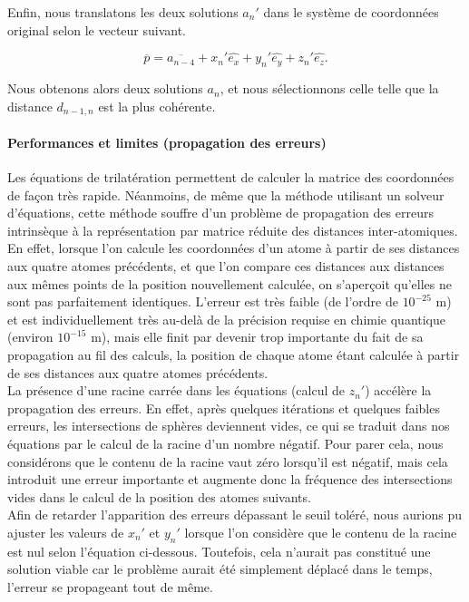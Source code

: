 \par Enfin, nous translatons les deux solutions $a_n'$ dans le système de coordonnées original selon le vecteur suivant.

\[
\overline{p} = \overline{a_{n-4}} + x_{n}'\hat{e_x} + y_{n}'\hat{e_y} + z_{n}'\hat{e_z}.
\]

\vspace{0.4cm}

Nous obtenons alors deux solutions $a_n$, et nous sélectionnons celle telle que la distance $d_{n-1,n}$ est la plus cohérente.


\paragraph{Performances et limites (propagation des erreurs)}
\par Les équations de trilatération permettent de calculer la matrice des coordonnées de façon très rapide. Néanmoins, de même que la méthode utilisant un solveur d'équations, cette méthode souffre d'un problème de propagation des erreurs intrinsèque à la représentation par matrice réduite des distances inter-atomiques. En effet, lorsque l'on calcule les coordonnées d'un atome à partir de ses distances aux quatre atomes précédents, et que l'on compare ces distances aux distances aux mêmes points de la position nouvellement calculée, on s'aperçoit qu'elles ne sont pas parfaitement identiques. L'erreur est très faible (de l'ordre de $10^{-25}$ m) et est individuellement très au-delà de la précision requise en chimie quantique (environ $10^{-15}$ m), mais elle finit par devenir trop importante du fait de sa propagation au fil des calculs, la position de chaque atome étant calculée à partir de ses distances aux quatre atomes précédents.\\
La présence d'une racine carrée dans les équations (calcul de $z_n'$) accélère la propagation des erreurs. En effet, après quelques itérations et quelques faibles erreurs, les intersections de sphères deviennent vides, ce qui se traduit dans nos équations par le calcul de la racine d'un nombre négatif. Pour parer cela, nous considérons que le contenu de la racine vaut zéro lorsqu'il est négatif, mais cela introduit une erreur importante et augmente donc la fréquence des intersections vides dans le calcul de la position des atomes suivants.\\
Afin de retarder l'apparition des erreurs dépassant le seuil toléré, nous aurions pu ajuster les valeurs de $x_n'$ et $y_n'$ lorsque l'on considère que le contenu de la racine est nul selon l'équation ci-dessous. Toutefois, cela n'aurait pas constitué une solution viable car le problème aurait été simplement déplacé dans le temps, l'erreur se propageant tout de même.\\

